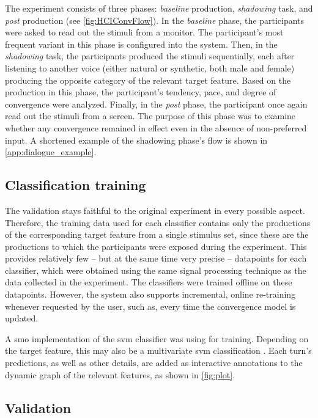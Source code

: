 The experiment consists of three phases: \emph{baseline} production, \emph{shadowing} task, and \emph{post} production (see \cref{fig:HCIConvFlow}).
In the \emph{baseline} phase, the participants were asked to read out the stimuli from a monitor.
The participant's most frequent variant in this phase is configured into the system.
Then, in the \emph{shadowing} task, the participants produced the stimuli sequentially, each after listening to another voice (either natural or synthetic, both male and female) producing the opposite category of the relevant target feature.
Based on the production in this phase, the participant's tendency, pace, and degree of convergence were analyzed.
Finally, in the \emph{post} phase, the participant once again read out the stimuli from a screen.
The purpose of this phase was to examine whether any convergence remained in effect even in the absence of non-preferred input.
A shortened example of the shadowing phase's flow is shown in \cref{app:dialogue_example}.

\subsection{Classification training}
\label{subsec:classification_training}

The validation stays faithful to the original experiment in every possible aspect.
Therefore, the training data used for each classifier contains only the productions of the corresponding target feature from a single stimulus set, since these are the productions to which the participants were exposed during the experiment.
This provides relatively few -- but at the same time very precise -- datapoints for each classifier,
which were obtained using the same signal processing technique as the data collected in the experiment.
The classifiers were trained offline on these datapoints.
However, the system also supports incremental, online re-training whenever requested by the user,
such as, every time the convergence model is updated.

A \ac{smo} \citep{Platt1999fast, Platt1998sequential} implementation of the \ac{svm} classifier \citep{Vapnik1998support} was using for training.
Depending on the target feature, this may also be a multivariate \ac{svm} classification \citep[e.g.,][]{Joachims2005support}.
Each turn's predictions, as well as other details, are added as interactive annotations to the dynamic graph of the relevant features, as shown in \cref{fig:plot}.

\subsection{Validation}
\label{subsec:validation}

